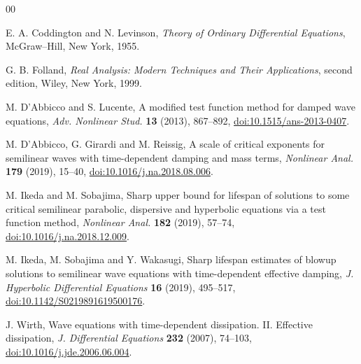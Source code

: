 \documentclass[11pt,reqno]{amsart}
\theoremstyle{definition}
\theoremstyle{remark}
\begin{document}
	\begin{thebibliography}{00}
		
		E. A. Coddington and N. Levinson,
		\emph{Theory of Ordinary Differential Equations},
		McGraw--Hill, New York, 1955.
		
		G. B. Folland,
		\emph{Real Analysis: Modern Techniques and Their Applications},
		second edition, Wiley, New York, 1999.
		
		M. D'Abbicco and S. Lucente,
		A modified test function method for damped wave equations,
		\emph{Adv. Nonlinear Stud.} \textbf{13} (2013), 867--892,
		\href{https://doi.org/10.1515/ans-2013-0407}{doi:10.1515/ans-2013-0407}.
		
		M. D'Abbicco, G. Girardi and M. Reissig,
		A scale of critical exponents for semilinear waves with time-dependent damping and mass terms,
		\emph{Nonlinear Anal.} \textbf{179} (2019), 15--40,
		\href{https://doi.org/10.1016/j.na.2018.08.006}{doi:10.1016/j.na.2018.08.006}.
		
		M. Ikeda and M. Sobajima,
		Sharp upper bound for lifespan of solutions to some critical semilinear parabolic, dispersive and hyperbolic equations via a test function method,
		\emph{Nonlinear Anal.} \textbf{182} (2019), 57--74,
		\href{https://doi.org/10.1016/j.na.2018.12.009}{doi:10.1016/j.na.2018.12.009}.
		
		M. Ikeda, M. Sobajima and Y. Wakasugi,
		Sharp lifespan estimates of blowup solutions to semilinear wave equations with time-dependent effective damping,
		\emph{J. Hyperbolic Differential Equations} \textbf{16} (2019), 495--517,
		\href{https://doi.org/10.1142/S0219891619500176}{doi:10.1142/S0219891619500176}.
		
		J. Wirth,
		Wave equations with time-dependent dissipation. II. Effective dissipation,
		\emph{J. Differential Equations} \textbf{232} (2007), 74--103,
		\href{https://doi.org/10.1016/j.jde.2006.06.004}{doi:10.1016/j.jde.2006.06.004}.
		
	\end{thebibliography}
	
\end{document}
